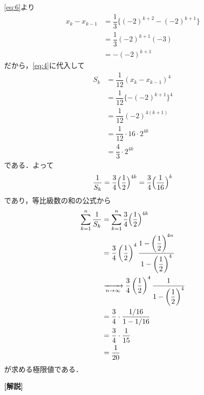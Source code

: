 \documentclass[../../main.tex]{subfiles}
\begin{document}
\cref{eq:6}より
\begin{align}
  x_k-x_{k-1}
  &=\dfrac{1}{3}\bigl\{(-2)^{k+2}-(-2)^{k+1}\bigr\} \\
  &=\dfrac{1}{3}(-2)^{k+1}(-3) \\
  &=-(-2)^{k+1}
\end{align}
だから，\cref{eq:4}に代入して
\begin{align}
  S_k
  &=\dfrac{1}{12}(x_k-x_{k-1})^4 \\
  &=\dfrac{1}{12}\{-(-2)^{k+1}\}^4 \\
  &=\dfrac{1}{12}(-2)^{4(k+1)} \\
  &=\dfrac{1}{12}\cdot16\cdot2^{4k} \\
  &=\dfrac{4}{3}\cdot2^{4k}
\end{align}
である．よって
\begin{align}
  \dfrac{1}{S_k}=\dfrac{3}{4}\Bigl(\dfrac{1}{2}\Bigr)^{4k}=\dfrac{3}{4}\Bigl(\dfrac{1}{16}\Bigr)^k
\end{align}
であり，等比級数の和の公式から
\begin{align}
  \sum_{k=1}^{n} \dfrac{1}{S_k}
  &=\sum_{k=1}^{n} \dfrac{3}{4}\Bigl(\dfrac{1}{2}\Bigr)^{4k} \\
  &=\dfrac{3}{4}\left(\dfrac{1}{2}\right)^{4}\dfrac{1-\left(\dfrac{1}{2}\right)^{4n}}{1-\left(\dfrac{1}{2}\right)^4} \\
  &\xrightarrow[n\to\infty]{} \dfrac{3}{4}\left(\dfrac{1}{2}\right)^{4}\dfrac{1}{1-\left(\dfrac{1}{2}\right)^4} \\
  &=\dfrac{3}{4}\cdot\dfrac{1/16}{1-1/16} \\
  &=\dfrac{3}{4}\cdot\dfrac{1}{15} \\
  &=\dfrac{1}{20}
\end{align}
が求める極限値である．

{\bf [解説]}
\end{document}
